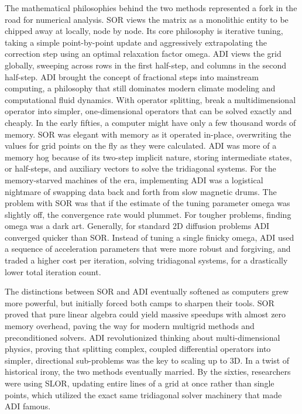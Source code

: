 The mathematical philosophies behind the two methods represented a fork in the road for numerical analysis. SOR views the matrix as a monolithic entity to be chipped away at locally, node by node. Its core philosophy is iterative tuning, taking a simple point-by-point update and aggressively extrapolating the correction step using an optimal relaxation factor omega. ADI views the grid globally, sweeping across rows in the first half-step, and columns in the second half-step. ADI brought the concept of fractional steps into mainstream computing, a philosophy that still dominates modern climate modeling and computational fluid dynamics. With operator splitting, break a multidimensional operator into simpler, one-dimensional operators that can be solved exactly and cheaply.
In the early fifties, a computer might have only a few thousand words of memory. SOR was elegant with memory as it operated in-place, overwriting the values for grid points on the fly as they were calculated. ADI was more of a memory hog because of its two-step implicit nature, storing intermediate states, or half-steps, and auxiliary vectors to solve the tridiagonal systems. For the memory-starved machines of the era, implementing ADI was a logistical nightmare of swapping data back and forth from slow magnetic drums. The problem with SOR was that if the estimate of the tuning parameter omega was slightly off, the convergence rate would plummet. For tougher problems, finding omega was a dark art. Generally, for standard 2D diffusion problems ADI converged quicker than SOR. Instead of tuning a single finicky omega, ADI used a sequence of acceleration parameters that were more robust and forgiving, and traded a higher cost per iteration, solving tridiagonal systems, for a drastically lower total iteration count.

The distinctions between SOR and ADI eventually softened as computers grew more powerful, but initially forced both camps to sharpen their tools. SOR proved that pure linear algebra could yield massive speedups with almost zero memory overhead, paving the way for modern multigrid methods and preconditioned solvers. ADI revolutionized thinking about multi-dimensional physics, proving that splitting complex, coupled differential operators into simpler, directional sub-problems was the key to scaling up to 3D. In a twist of historical irony, the two methods eventually married. By the sixties, researchers were using SLOR, updating entire lines of a grid at once rather than single points, which utilized the exact same tridiagonal solver machinery that made ADI famous.


